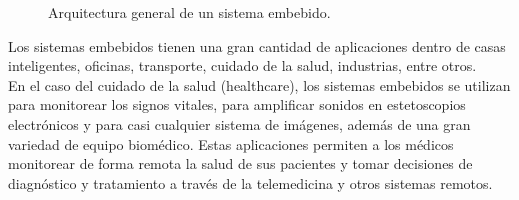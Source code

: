 	\begin{figure}[htbp!]
		\centering
		\caption{Arquitectura general de un sistema embebido.}
		\label{fig:MarcoArquiSE}
	\end{figure}

	Los sistemas embebidos tienen una gran cantidad de aplicaciones dentro de casas inteligentes, oficinas, transporte, cuidado de la salud, industrias, entre otros. \\
	
	En el caso del cuidado de la salud (healthcare), los sistemas embebidos se utilizan para monitorear los signos vitales, para amplificar sonidos en estetoscopios electrónicos y para casi cualquier sistema de imágenes, además de una gran variedad de equipo biomédico. Estas aplicaciones permiten a los médicos monitorear de forma remota la salud de sus pacientes y tomar decisiones de diagnóstico y tratamiento a través de la telemedicina y otros sistemas remotos. \cite{delkinEmbSys} \\
	
